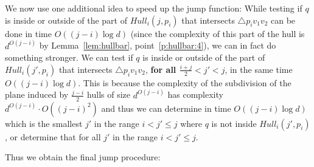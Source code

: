 \documentclass[12pt,a4paper,USenglish,cleveref, autoref, thm-restate]{article}
\newcommand{\Hull}{\mathit{Hull}}
\newcommand{\NN}{\mathit{NN}}
\newcommand{\Hull}{\mathit{Hull}}
\newcommand{\NN}{\mathit{NN}}
\newcommand{\Hull}{\mathit{Hull}}
\newcommand{\NN}{\mathit{NN}}
\begin{document}
%
%

We now use one additional idea to speed up the jump function: While testing if $q$ is inside or outside of the part of $\Hull_i(j,p_i)$ that intersects $\triangle p_iv_1v_2$ can be done in time $O((j-i)\log d)$ (since the complexity of this part of the hull is $d^{O(j-i)}$ by Lemma~\ref{lem:hullbar}, point~\ref{p:hullbar:4}), we can in fact do something stronger. We can test if $q$ is inside or outside of the part of $\Hull_i(j',p_i)$ that intersects $\triangle p_iv_1v_2$, \textbf{for all $\frac{i+j}{2}<j'<j$}, in the same time $O((j-i)\log d)$. This is because the complexity of the subdivision of the plane induced by  $\frac{j-i}{2}$ hulls of size $d^{O(j-i)}$ has complexity  $d^{O(j-i)}\cdot O((j-i)^{2})$ and thus we can determine in time $O((j-i)\log d)$ which is the smallest $j'$ in the range $i<j'\leq j$ where $q$ is not inside $\Hull_i(j',p_i)$, or determine that for all $j'$ in the range $i<j'\leq j$.

Thus we obtain the final jump procedure:


\end{document}
